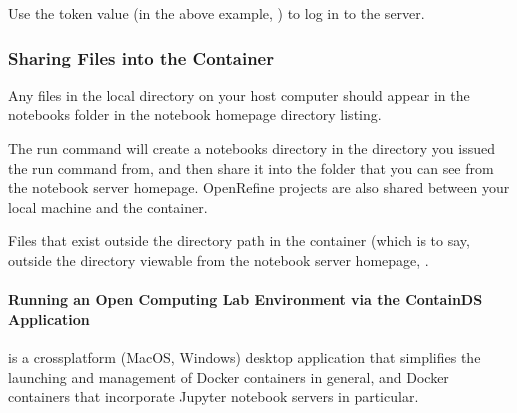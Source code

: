 \documentclass[letterpaper,10pt,english]{sphinxmanual}
\begin{document}
Use the token value (in the above example, ) to log in to the server.


\subsubsection{Sharing Files into the Container}
\label{\detokenize{content/00_READ_ME_FIRST/Section_00_05_Accessing_RoboLab:Sharing-Files-into-the-Container}}
Any files in the local  directory on your host computer should appear in the notebooks folder in the notebook homepage directory listing.

The run command will create a notebooks directory in the directory you issued the run command from, and then share it into the  folder that you can see from the notebook server homepage. OpenRefine projects are also shared between your local machine and the container.

Files that exist outside the  directory path in the container (which is to say, outside the  directory viewable from the notebook server homepage, .


\paragraph{Running an Open Computing Lab Environment via the ContainDS Application}
\label{\detokenize{content/00_READ_ME_FIRST/Section_00_05_Accessing_RoboLab:Running-an-Open-Computing-Lab-Environment-via-the-ContainDS-Application}}

 is a cross\sphinxhyphen{}platform (MacOS, Windows) desktop application that simplifies the launching and management of Docker containers in general, and Docker containers that incorporate Jupyter notebook servers in particular.

\end{document}
